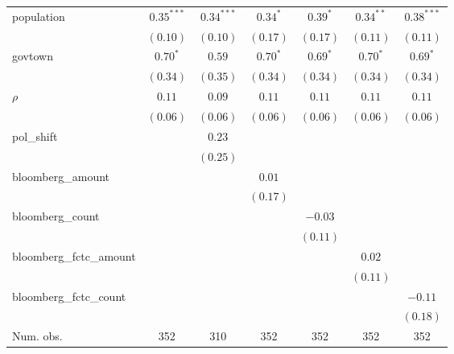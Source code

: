 \begin{table}[!h]
\begin{center}
\begin{tabular}{l c c c c c c }
population              & $0.35^{***}$ & $0.34^{***}$  & $0.34^{*}$   & $0.39^{*}$   & $0.34^{**}$  & $0.38^{***}$ \\
                        & $(0.10)$     & $(0.10)$      & $(0.17)$     & $(0.17)$     & $(0.11)$     & $(0.11)$     \\
govtown                 & $0.70^{*}$   & $0.59$        & $0.70^{*}$   & $0.69^{*}$   & $0.70^{*}$   & $0.69^{*}$   \\
                        & $(0.34)$     & $(0.35)$      & $(0.34)$     & $(0.34)$     & $(0.34)$     & $(0.34)$     \\
$\rho$                  & $0.11$       & $0.09$        & $0.11$       & $0.11$       & $0.11$       & $0.11$       \\
                        & $(0.06)$     & $(0.06)$      & $(0.06)$     & $(0.06)$     & $(0.06)$     & $(0.06)$     \\
pol\_shift              &              & $0.23$        &              &              &              &              \\
                        &              & $(0.25)$      &              &              &              &              \\
bloomberg\_amount       &              &               & $0.01$       &              &              &              \\
                        &              &               & $(0.17)$     &              &              &              \\
bloomberg\_count        &              &               &              & $-0.03$      &              &              \\
                        &              &               &              & $(0.11)$     &              &              \\
bloomberg\_fctc\_amount &              &               &              &              & $0.02$       &              \\
                        &              &               &              &              & $(0.11)$     &              \\
bloomberg\_fctc\_count  &              &               &              &              &              & $-0.11$      \\
                        &              &               &              &              &              & $(0.18)$     \\
\midrule
Num. obs.               & 352          & 310           & 352          & 352          & 352          & 352          \\

\end{tabular}
\end{center}
\end{table}
